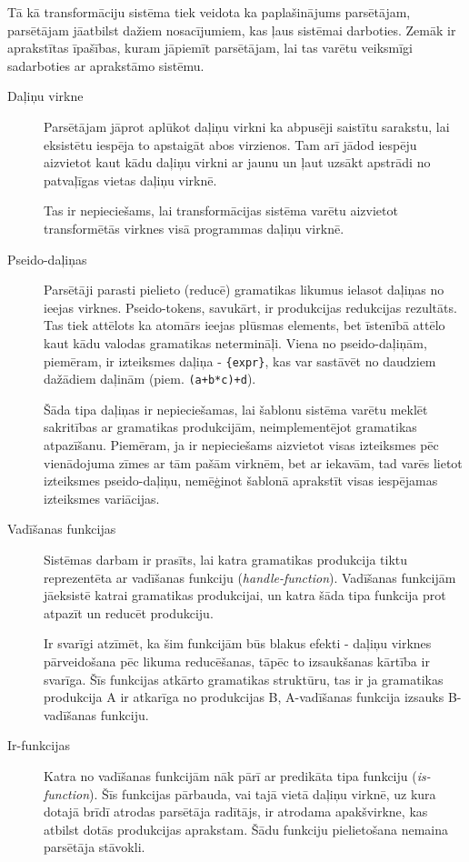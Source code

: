 Tā kā transformāciju sistēma tiek veidota ka paplašinājums parsētājam, parsētājam jāatbilst dažiem nosacījumiem, kas ļaus sistēmai darboties. Zemāk ir aprakstītas īpašības, kuram jāpiemīt parsētājam, lai tas varētu veiksmīgi sadarboties ar aprakstāmo sistēmu.

\begin{description}
\item[Daļiņu virkne]
Parsētājam jāprot aplūkot daļiņu virkni ka abpusēji saistītu sarakstu, lai eksistētu iespēja to apstaigāt abos virzienos. Tam arī jādod iespēju aizvietot kaut kādu daļiņu virkni ar jaunu un ļaut uzsākt apstrādi no patvaļīgas vietas daļiņu virknē.

Tas ir nepieciešams, lai transformācijas sistēma varētu aizvietot transformētās virknes visā programmas daļiņu virknē.

\item[Pseido-daļiņas]
Parsētāji parasti pielieto (reducē) gramatikas likumus ielasot daļiņas no ieejas virknes. Pseido-tokens, savukārt, ir produkcijas redukcijas rezultāts. Tas tiek attēlots ka atomārs ieejas plūsmas elements, bet īstenībā attēlo kaut kādu valodas gramatikas netermināļi. Viena no pseido-daļiņām, piemēram, ir izteiksmes daļiņa - \verb|{expr}|, kas var sastāvēt no daudziem dažādiem daļinām (piem. \verb|(a+b*c)+d|).

Šāda tipa daļiņas ir nepieciešamas, lai šablonu sistēma varētu meklēt sakritības ar gramatikas produkcijām, neimplementējot gramatikas atpazīšanu. Piemēram, ja ir nepieciešams aizvietot visas izteiksmes pēc vienādojuma zīmes ar tām pašām virknēm, bet ar iekavām, tad varēs lietot izteiksmes pseido-daļiņu, nemēģinot šablonā aprakstīt visas iespējamas izteiksmes variācijas.

\item[Vadīšanas funkcijas]
Sistēmas darbam ir prasīts, lai katra gramatikas produkcija tiktu reprezentēta ar vadīšanas funkciju (\emph{handle-function}). Vadīšanas funkcijām jāeksistē katrai gramatikas produkcijai, un katra šāda tipa funkcija prot atpazīt un reducēt produkciju.

Ir svarīgi atzīmēt, ka šim funkcijām būs blakus efekti - daļiņu virknes pārveidošana pēc likuma reducēšanas, tāpēc to izsaukšanas kārtība ir svarīga. Šīs funkcijas atkārto gramatikas struktūru, tas ir ja gramatikas produkcija A ir atkarīga no produkcijas B, A-vadīšanas funkcija izsauks B-vadīšanas funkciju.

\item[Ir-funkcijas]
Katra no vadīšanas funkcijām nāk pārī ar predikāta tipa funkciju (\emph{is-function}). Šīs funkcijas pārbauda, vai tajā vietā daļiņu virknē, uz kura dotajā brīdī atrodas parsētāja radītājs, ir atrodama apakšvirkne, kas atbilst dotās produkcijas aprakstam. Šādu funkciju pielietošana nemaina parsētāja stāvokli.


\end{description}
